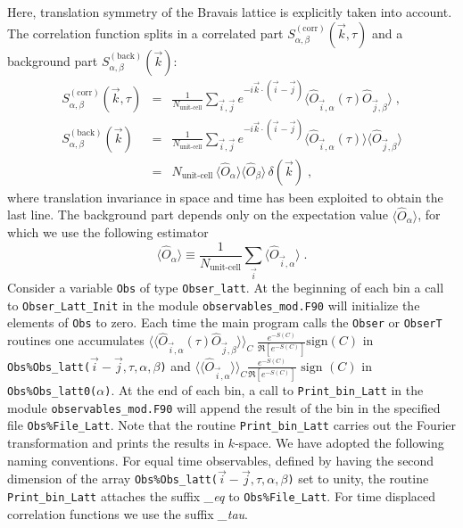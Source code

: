 %
Here,  translation symmetry of the Bravais lattice is explicitly taken into account. 
The correlation function splits in a correlated part $S_{\alpha,\beta}^{\mathrm{(corr)}}(\vec{k},\tau)$ and a background part $S_{\alpha,\beta}^{\mathrm{(back)}}(\vec{k})$:
\begin{eqnarray}
  S_{\alpha,\beta}^{\mathrm{(corr)}}(\vec{k},\tau)
  &=&
   \frac{1}{N_{\text{unit-cell}}} \sum_{\vec{i},\vec{j}}  e^{- i\vec{k} \cdot \left( \vec{i}-\vec{j}\right) }  \langle \hat{O}_{\vec{i},\alpha} (\tau) \hat{O}_{\vec{j},\beta} \rangle\label{eqn:s_corr}\;,\\
         S_{\alpha,\beta}^{\mathrm{(back)}}(\vec{k})
  &=&
   \frac{1}{N_{\text{unit-cell}}} \sum_{\vec{i},\vec{j}}  e^{- i\vec{k} \cdot \left( \vec{i}-\vec{j}\right) }  \langle \hat{O}_{\vec{i},\alpha} (\tau)\rangle \langle \hat{O}_{\vec{j},\beta} \rangle\nonumber\\
  &=& 
  N_{\text{unit-cell}}\, \langle \hat{O}_{\alpha} \rangle \langle \hat{O}_{\beta} \rangle \, \delta(\vec{k})\label{eqn:s_back}\;,
\end{eqnarray}
where translation invariance in space and time has been exploited to obtain the last line. 
The background part depends only on the expectation value $\langle \hat{O}_{\alpha} \rangle$, for which we use the following estimator 
\begin{equation}\label{eqn:o}
\langle \hat{O}_{\alpha} \rangle \equiv \frac{1}{N_{\text{unit-cell}}} \sum\limits_{\vec{i}} \langle \hat{O}_{\vec{i},\alpha} \rangle\;.
\end{equation}
Consider a variable  \texttt{Obs} of type  \texttt{Obser\_latt}. At the beginning of each bin a call to  \texttt{Obser\_Latt\_Init} in the module \texttt{observables\_mod.F90}  will  initialize  the elements of \texttt{Obs} to zero.    Each time the main program calls the   \texttt{Obser} or  \texttt{ObserT} routines one accumulates $ \langle \langle \hat{O}_{\vec{i},\alpha} (\tau) \hat{O}_{\vec{j},\beta} \rangle \rangle_{C} \; \frac{e^{-S(C)}} {\Re \left[e^{-S(C)} \right]}  \text{sign}(C) $    in  \texttt{Obs\%Obs\_latt($\vec{i}-\vec{j},\tau,\alpha,\beta$)}   
and $ \langle \langle \hat{O}_{\vec{i},\alpha} \rangle \rangle_{C}\frac{e^{-S(C)}} {\Re \left[e^{-S(C)} \right]}  \text{ sign }(C) $  in \texttt{Obs\%Obs\_latt0($\alpha$)}.   At the end of each bin, a call to \texttt{Print\_bin\_Latt} in the module  \texttt{observables\_mod.F90}   will append the result of the bin in the specified  file \texttt{Obs\%File\_Latt}.   Note that the routine  \texttt{Print\_bin\_Latt}  carries out the Fourier transformation and prints the results in $k$-space. 
We have adopted the following naming conventions.
For equal time observables,
defined by having the second  dimension  of the array  \texttt{Obs\%Obs\_latt($\vec{i}-\vec{j},\tau,\alpha,\beta$)}   set to unity, 
the routine \texttt{Print\_bin\_Latt}  attaches the suffix \emph{\_eq} to \texttt{Obs\%File\_Latt}.  For  time displaced correlation functions we use the suffix \emph{\_tau}.

